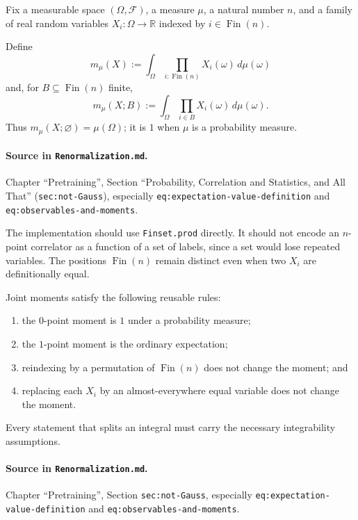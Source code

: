 Fix a measurable space $(\Omega,\mathcal F)$, a measure $\mu$, a natural number $n$, and a family
of real random variables $X_i:\Omega\to\mathbb R$ indexed by $i\in\operatorname{Fin}(n)$.

\begin{definition}
\label{def:renorm:jointMoment}
Define
\[
  m_\mu(X) := \int_\Omega \prod_{i:\operatorname{Fin}(n)} X_i(\omega)\,d\mu(\omega)
\]
and, for $B\subseteq\operatorname{Fin}(n)$ finite,
\[
  m_\mu(X;B) := \int_\Omega \prod_{i\in B}X_i(\omega)\,d\mu(\omega).
\]
Thus $m_\mu(X;\varnothing)=\mu(\Omega)$; it is $1$ when $\mu$ is a probability measure.

\paragraph{Source in \texttt{Renormalization.md}.}
Chapter ``Pretraining'', Section ``Probability, Correlation and Statistics, and All That''
(\texttt{sec:not-Gauss}), especially \texttt{eq:expectation-value-definition} and
\texttt{eq:observables-and-moments}.
\end{definition}

The implementation should use \texttt{Finset.prod} directly.  It should not encode an
$n$-point correlator as a function of a set of labels, since a set would lose repeated variables.
The positions $\operatorname{Fin}(n)$ remain distinct even when two $X_i$ are definitionally equal.

\begin{lemma}
\label{lem:renorm:jointMomentBasic}
Joint moments satisfy the following reusable rules:
\begin{enumerate}
  \item the $0$-point moment is $1$ under a probability measure;
  \item the $1$-point moment is the ordinary expectation;
  \item reindexing by a permutation of $\operatorname{Fin}(n)$ does not change the moment; and
  \item replacing each $X_i$ by an almost-everywhere equal variable does not change the moment.
\end{enumerate}
Every statement that splits an integral must carry the necessary integrability assumptions.

\paragraph{Source in \texttt{Renormalization.md}.}
Chapter ``Pretraining'', Section \texttt{sec:not-Gauss}, especially
\texttt{eq:expectation-value-definition} and \texttt{eq:observables-and-moments}.
\end{lemma}

